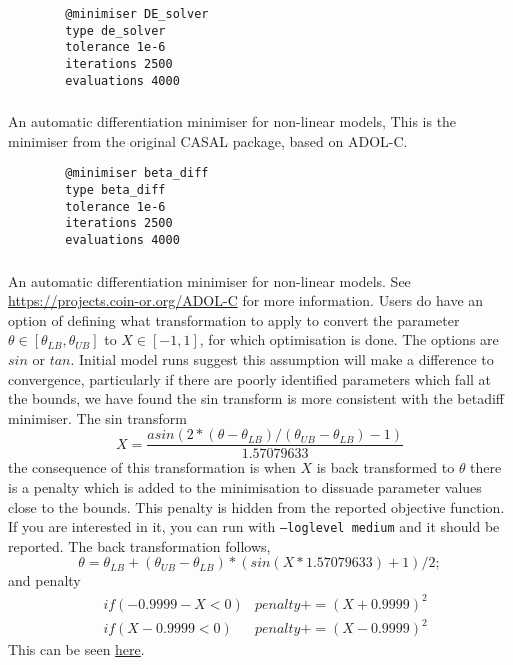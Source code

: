 {\small{\begin{verbatim}
		@minimiser DE_solver
		type de_solver
		tolerance 1e-6
		iterations 2500
		evaluations 4000
\end{verbatim}}}

\subsubsection{}\label{sec:Minimiser-BetaDiff}

An automatic differentiation minimiser for non-linear models, This is the minimiser from the original CASAL package, based on ADOL-C.

{\small{\begin{verbatim}
		@minimiser beta_diff
		type beta_diff
		tolerance 1e-6
		iterations 2500
		evaluations 4000
\end{verbatim}}}

\subsubsection{}\label{sec:Minimiser-ADOLC}

An automatic differentiation minimiser for non-linear models. See \url{https://projects.coin-or.org/ADOL-C} for more information. Users do have an option of defining what transformation to apply to convert the parameter \(\theta \in [\theta_{LB}, \theta_{UB}]\) to \(X \in [-1, 1]\), for which optimisation is done. The options are $sin$ or $tan$. Initial model runs suggest this assumption will make a difference to convergence, particularly if there are poorly identified parameters which fall at the bounds, we have found the sin transform is more consistent with the betadiff minimiser. The sin transform
\begin{equation}
	X = \frac{asin(2 * (\theta - \theta_{LB}) / (\theta_{UB} - \theta_{LB}) - 1)}{ 1.57079633}
\end{equation}
%
the consequence of this transformation is when \(X\) is back transformed to \(\theta\) there is a penalty which is added to the minimisation to dissuade parameter values close to the bounds. This penalty is hidden from the reported objective function. If you are interested in it, you can run with \texttt{--loglevel medium} and it should be reported. The back transformation follows,
\begin{equation}
\theta = \theta_{LB} + (\theta_{UB} - \theta_{LB}) * (sin(X * 1.57079633) + 1) / 2;
\end{equation}
%
and penalty
\begin{align}
	&if(-0.9999 - X < 0) & penalty += (X + 0.9999)^2\\
	&if(X - 0.9999 < 0) & penalty += (X - 0.9999)^2
\end{align}
%
This can be seen  \href{https://github.com/NIWAFisheriesModelling/CASAL2/blob/1b1ed731537dc551674c911da3bf387273a97a92/CASAL2/source/Utilities/Math.h#L245}{here}.

